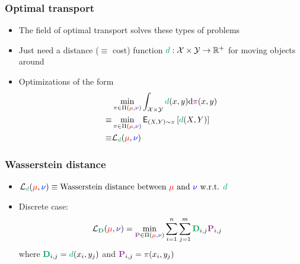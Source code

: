 \documentclass[mathserif,compress,xcolor={dvipsnames}]{beamer}
\newcommand*\reals{\mathbb{R}}
\newcommand*\ba{\[ \begin{aligned}}
\newcommand*\ea{\end{aligned} \]}
\newcommand*\Esub[2]{\mathsf{E}_{#1}\left[#2\right]}
\newcommand*\der{\text{d}}
\renewcommand\;{\,}
\begin{document}
\begin{frame}\frametitle{Optimal transport}
\begin{itemize}
\item
The field of optimal transport solves these types of problems
\bigskip
\item
Just need a {\color{Green} distance} ($\equiv$ cost) function 
${\color{Green} d}:\mathcal{X} \times \mathcal{Y} \to \reals^+$ for {\color{Purple} moving} objects around
\bigskip
\item
Optimizations of the form
\begin{align}
	\ & \min_{{\color{violet} \pi} \in \Pi({\color{red} \mu}, {\color{blue} \nu})} 
		\int_{\mathcal X \times \mathcal Y} 
		{\color{Green} d}(x, y) \der {\color{violet} \pi}(x, y) \\
	\equiv & \min_{{\color{violet} \pi} \in 
		\Pi({\color{red} \mu}, {\color{blue} \nu})}
		 \Esub{(X, Y) \sim {\color{violet} \pi}}{ {\color{Green} d}(X, Y) } \\
	\equiv & \mathcal L_{{\color{Green} d}}(
		{\color{red} \mu}, {\color{blue} \nu}) \end{align}
\end{itemize}
\end{frame}

\begin{frame}\frametitle{Wasserstein distance}
\begin{itemize}
\item[]
$
\mathcal L_{{\color{Green} d}}(
		{\color{red} \mu}, {\color{blue} \nu}) 
	\equiv \text{Wasserstein distance between ${\color{red} \mu}$ and ${\color{blue} \nu}$ w.r.t. ${\color{Green} d}$}
$
\bigskip
\item[]
Discrete case:
\ba
\mathcal L_{{\color{Green} \mathbf D}}(
		{\color{red} \mu}, {\color{blue} \nu})
	& = \min_{{\color{Purple} \mathbf P} \in \Pi({\color{red} \mu}, {\color{blue} \nu})}
		\sum_{i=1}^n \sum_{j=1}^m \mathbf {\color{Green} D}_{i,j} \mathbf {\color{Purple} \mathbf P}_{i,j}
\ea
where
$\mathbf {\color{Green} D}_{i,j} = {\color{Green} d}(x_i, y_j)$ 
and
$\mathbf {\color{Purple} \mathbf P}_{i,j} = {\color{violet} \pi}(x_i, y_j)$
\end{itemize}
\end{frame}
\end{document}

